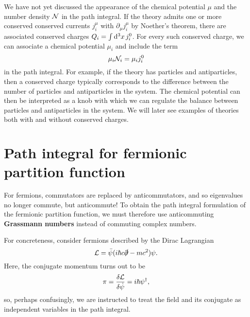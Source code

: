 We have not yet discussed the appearance of the chemical potential $\mu$ and the number density $\mathcal{N}$ in the path integral.
If the theory admits one or more conserved conserved currents $j_i^\mu$ with $\partial_\mu j_i^\mu$ by Noether's theorem, there are associated conserved charges $Q_i = \int \mathop{}\!\mathrm{d}^3 x \, j_i^0$.
For every such conserved charge, we can associate a chemical potential $\mu_i$ and include the term
\begin{equation}
	\mu_i \mathcal{N}_i = \mu_i j_i^0
\label{eq:tft:chemical_potential}
\end{equation}
in the path integral.
For example, if the theory has particles and antiparticles, then a conserved charge typically corresponds to the difference between the number of particles and antiparticles in the system.
The chemical potential can then be interpreted as a knob with which we can regulate the balance between particles and antiparticles in the system.
We will later see examples of theories both with and without conserved charges.


\section{Path integral for fermionic partition function}


For fermions, commutators are replaced by anticommutators, and so eigenvalues no longer commute, but anticommute! 
To obtain the path integral formulation of the fermionic partition function, we must therefore use anticommuting \textbf{Grassmann numbers} instead of commuting complex numbers.

For concreteness, consider fermions described by the Dirac Lagrangian
\begin{equation}
	\mathcal{L} = \bar{\psi} (i \hbar c \slashed\partial - m c^2) \psi .
\end{equation}
Here, the conjugate momentum turns out to be
\begin{equation}
	\pi = \fdv{\lagr}{\dot\psi} = i \hbar \psi^\dagger ,
\label{eq:tft:dirac_conjugate_momentum}
\end{equation}
so, perhaps confusingly, we are instructed to treat the field and its conjugate as independent variables in the path integral.

